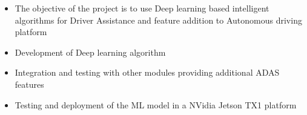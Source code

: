 \documentclass[10pt,a4paper,ragged2e,withhyper]{altacv}
\begin{document}
\begin{paracol}{2}








            \end{paracol}

            \newpage






            \begin{itemize}
                \item The objective of the project is to use Deep learning based intelligent algorithms for Driver Assistance and feature addition to Autonomous driving platform
                \item Development of Deep learning algorithm
                \item  Integration and testing with other modules providing additional ADAS features
                \item  Testing and deployment of the ML model in a NVidia Jetson TX1 platform
            \end{itemize}
            \divider
\end{document}
